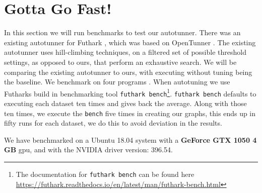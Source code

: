 \section{Gotta Go Fast!}
In this section we will run benchmarks to test our autotunner. There was an
existing autotunner for Futhark \cite{oldtune}, which was based on OpenTunner
\cite{opentunner}. The existing autotunner uses hill-climbing techniques, on a
filtered set of possible threshold settings, as opposed to ours, that perform
an exhaustive search. We will be comparing the existing autotunner to ours,
with executing without tuning being the baseline. We benchmark on four programs \cite{ppopp}. When autotuning we use Futharks build in benchmarking tool \texttt{futhark bench}\footnote{The documentation for \texttt{futhark bench} can be found here \url{https://futhark.readthedocs.io/en/latest/man/futhark-bench.html}}. \texttt{futhark bench} defaults to executing each dataset ten times and gives back the average. Along with those ten times, we execute the \texttt{bench} five times in creating our graphs, this ends up in fifty runs for each dataset, we do this to avoid deviation in the results.  

We have benchmarked on a Ubuntu 18.04 system with a \textbf{GeForce GTX 1050 4 GB} gpu, and with the NVIDIA driver version: 396.54.  

